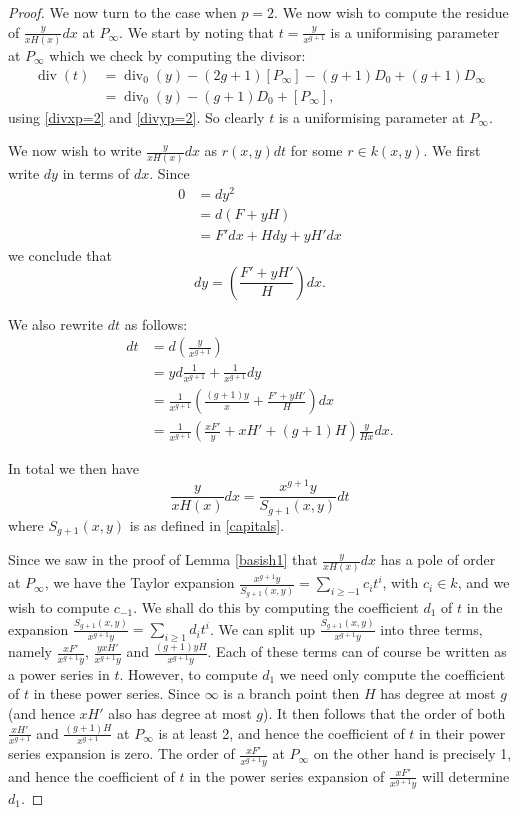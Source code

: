 \documentclass[draft, 11pt]{article} %
\theoremstyle{plain}
\theoremstyle{remark}
\DeclareMathOperator{\di}{div}
\begin{document}
\begin{proof}
We now turn to the case when $p=2$.
We now wish to compute the residue of $\frac{y}{xH(x)}dx$ at $P_\infty$.
We start by noting that $t = \frac{y}{x^{g+1}}$ is a uniformising parameter at $P_\infty$ which we check by computing the divisor:
\begin{align*}
\di(t) & = \di_0(y) - (2g+1)[P_\infty] -(g+1)D_0 + (g+1)D_\infty \\
& = \di_0(y)-(g+1)D_0 + [P_\infty],
\end{align*}
using \eqref{divxp=2} and \eqref{divyp=2}.
So clearly $t$ is a uniformising parameter at $P_\infty$.

We now wish to write $\frac{y}{xH(x)}dx$ as $r(x,y)dt$ for some $r \in k(x,y)$.
We first write $dy$ in terms of $dx$.
Since
\begin{align*}
0 & =  dy^2 \\
& =  d(F+yH) \\
& =  F'dx + Hdy + yH'dx
\end{align*}
we conclude that
\[
dy = \left( \frac{F'+yH'}{H} \right) dx.
\]

We also rewrite $dt$ as follows:
\begin{align*}
dt & =  d\left( \frac{y}{x^{g+1}} \right) \\
& =  yd\frac{1}{x^{g+1}} + \frac{1}{x^{g+1}}dy \\
& =  \frac{1}{x^{g+1}} \left( \frac{(g+1)y}{x} + \frac{F'+yH'}{H} \right) dx \\
& =  \frac{1}{x^{g+1}} \left( \frac{xF'}{y} + xH' + (g+1)H \right) \frac{y}{Hx} dx.
\end{align*}

In total we then have
\[
\frac{y}{xH(x)}dx = \frac{x^{g+1}y}{S_{g+1}(x,y)}dt
\]
where $S_{g+1}(x,y)$ is as defined in \eqref{capitals}.

Since we saw in the proof of Lemma \ref{basish1} that $\frac{y}{xH(x)}dx$ has a pole of order at $P_\infty$, we have the Taylor expansion $\frac{x^{g+1}y}{S_{g+1}(x,y)} = \sum_{i\geq -1} c_i t^i$, with $c_i \in k$, and we wish to compute $c_{-1}$.
We shall do this by computing the coefficient $d_1$ of $t$ in the expansion $\frac{S_{g+1}(x,y)}{x^{g+1}y} = \sum_{i\geq 1}d_it^i$.
We can split up $\frac{S_{g+1}(x,y)}{x^{g+1}y}$ into three terms, namely $\frac{xF'}{x^{g+1}y}$, $\frac{yxH'}{x^{g+1}y}$ and $\frac{(g+1)yH}{x^{g+1}y}$.
Each of these terms can of course be written as a power series in $t$.
However, to compute $d_1$ we need only compute the coefficient of $t$ in these power series.
Since $\infty$ is a branch point then $H$ has degree at most $g$ (and hence $xH'$ also has degree at most $g$).
It then follows that the order of both $\frac{xH'}{x^{g+1}}$ and $\frac{(g+1)H}{x^{g+1}}$ at $P_\infty$ is at least 2, and hence the coefficient of $t$ in their power series expansion is zero.
The order of $\frac{xF'}{x^{g+1}y}$ at $P_\infty$ on the other hand is precisely 1, and hence the coefficient of $t$ in the power series expansion of $\frac{xF'}{x^{g+1}y}$ will determine $d_1$.



\end{proof}
\end{document}
